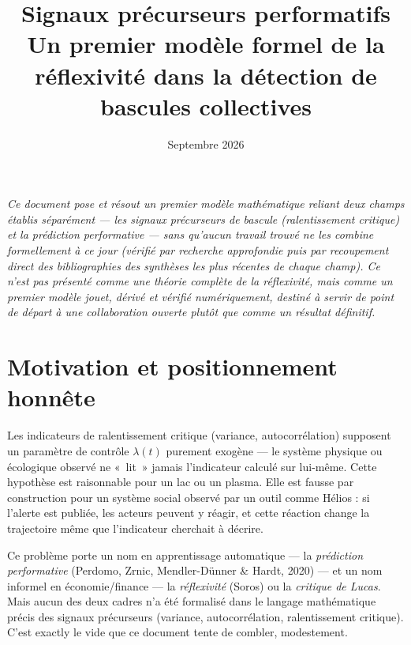\documentclass[11pt,a4paper]{article}
\title{\textbf{Signaux précurseurs performatifs}\\[4pt]
\large Un premier modèle formel de la réflexivité dans la détection de bascules collectives}
\author{}
\date{Septembre 2026}
\begin{document}
\maketitle

\begin{center}
\begin{minipage}{0.85\textwidth}
\small\itshape
Ce document pose et résout un premier modèle mathématique reliant deux
champs établis séparément — les signaux précurseurs de bascule
(ralentissement critique) et la prédiction performative — sans qu'aucun
travail trouvé ne les combine formellement à ce jour (vérifié par
recherche approfondie puis par recoupement direct des bibliographies des
synthèses les plus récentes de chaque champ). Ce n'est pas présenté
comme une théorie complète de la réflexivité, mais comme un premier
modèle jouet, dérivé et vérifié numériquement, destiné à servir de point
de départ à une collaboration ouverte plutôt que comme un résultat
définitif.
\end{minipage}
\end{center}

\tableofcontents

\section{Motivation et positionnement honnête}

Les indicateurs de ralentissement critique (variance, autocorrélation)
supposent un paramètre de contrôle $\lambda(t)$ purement exogène — le
système physique ou écologique observé ne «~lit~» jamais
l'indicateur calculé sur lui-même. Cette hypothèse est raisonnable pour
un lac ou un plasma. Elle est fausse par construction pour un système
social observé par un outil comme Hélios : si l'alerte est publiée, les
acteurs peuvent y réagir, et cette réaction change la trajectoire même
que l'indicateur cherchait à décrire.

\begin{remarque}
Ce problème porte un nom en apprentissage automatique — la
\emph{prédiction performative} (Perdomo, Zrnic, Mendler-Dünner \& Hardt,
2020) — et un nom informel en économie/finance — la \emph{réflexivité}
(Soros) ou la \emph{critique de Lucas}. Mais aucun des deux cadres n'a
été formalisé dans le langage mathématique précis des signaux
précurseurs (variance, autocorrélation, ralentissement critique). C'est
exactly le vide que ce document tente de combler, modestement.
\end{remarque}
\end{document}

